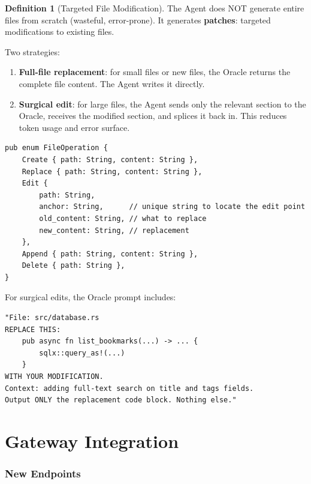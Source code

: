 \documentclass[11pt,a4paper,twoside]{article}
\theoremstyle{definition}
\newtheorem{definition}{Definition}[section]
\theoremstyle{remark}
\begin{document}
\begin{definition}[Targeted File Modification]\label{def:modify}
The Agent does NOT generate entire files from scratch (wasteful,
error-prone). It generates \textbf{patches}: targeted modifications
to existing files.

Two strategies:
\begin{enumerate}[nosep]
  \item \textbf{Full-file replacement}: for small files or new files,
        the Oracle returns the complete file content. The Agent writes
        it directly.
  \item \textbf{Surgical edit}: for large files, the Agent sends only
        the relevant section to the Oracle, receives the modified
        section, and splices it back in. This reduces token usage and
        error surface.
\end{enumerate}

\begin{lstlisting}
pub enum FileOperation {
    Create { path: String, content: String },
    Replace { path: String, content: String },
    Edit {
        path: String,
        anchor: String,      // unique string to locate the edit point
        old_content: String, // what to replace
        new_content: String, // replacement
    },
    Append { path: String, content: String },
    Delete { path: String },
}
\end{lstlisting}

For surgical edits, the Oracle prompt includes:
\begin{lstlisting}
"File: src/database.rs
REPLACE THIS:
    pub async fn list_bookmarks(...) -> ... {
        sqlx::query_as!(...)
    }
WITH YOUR MODIFICATION.
Context: adding full-text search on title and tags fields.
Output ONLY the replacement code block. Nothing else."
\end{lstlisting}
\end{definition}


\part{Gateway Integration}\label{part:gateway}

\section{New Endpoints}\label{sec:endpoints}
\end{document}
